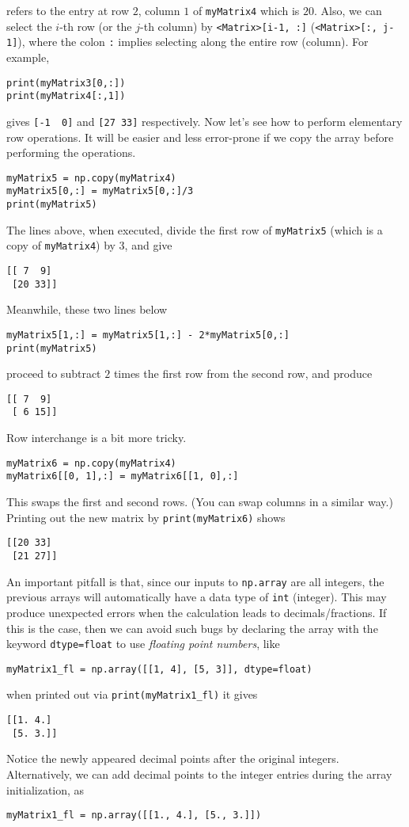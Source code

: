 refers to the entry at row $2$, column $1$ of \verb|myMatrix4| which is $20$. Also, we can select the $i$-th row (or the $j$-th column) by \verb|<Matrix>[i-1, :]| (\verb|<Matrix>[:, j-1]|), where the colon \verb|:| implies selecting along the entire row (column). For example,
\begin{lstlisting}
print(myMatrix3[0,:])
print(myMatrix4[:,1])
\end{lstlisting}
gives
\verb|[-1  0]| and \verb|[27 33]| respectively. Now let's see how to perform elementary row operations. It will be easier and less error-prone if we copy the array before performing the operations.
\begin{lstlisting}
myMatrix5 = np.copy(myMatrix4)
myMatrix5[0,:] = myMatrix5[0,:]/3
print(myMatrix5)
\end{lstlisting}
The lines above, when executed, divide the first row of \verb|myMatrix5| (which is a copy of \verb|myMatrix4|) by $3$, and give
\begin{lstlisting}
[[ 7  9]
 [20 33]]    
\end{lstlisting}
Meanwhile, these two lines below
\begin{lstlisting}
myMatrix5[1,:] = myMatrix5[1,:] - 2*myMatrix5[0,:]
print(myMatrix5)
\end{lstlisting}
proceed to subtract $2$ times the first row from the second row, and produce
\begin{lstlisting}
[[ 7  9]
 [ 6 15]]
\end{lstlisting}
Row interchange is a bit more tricky.
\begin{lstlisting}
myMatrix6 = np.copy(myMatrix4)
myMatrix6[[0, 1],:] = myMatrix6[[1, 0],:]
\end{lstlisting}
This swaps the first and second rows. (You can swap columns in a similar way.) Printing out the new matrix by \verb|print(myMatrix6)| shows
\begin{lstlisting}
[[20 33]
 [21 27]]
\end{lstlisting}
An important pitfall is that, since our inputs to \texttt{np.array} are all integers, the previous arrays will automatically have a data type of \texttt{int} (integer). This may produce unexpected errors when the calculation leads to decimals/fractions. If this is the case, then we can avoid such bugs by declaring the array with the keyword \verb|dtype=float| to use \textit{floating point numbers}, like
\begin{lstlisting}
myMatrix1_fl = np.array([[1, 4], [5, 3]], dtype=float)
\end{lstlisting}
when printed out via \verb|print(myMatrix1_fl)| it gives
\begin{lstlisting}
[[1. 4.]
 [5. 3.]]    
\end{lstlisting}
Notice the newly appeared decimal points after the original integers. Alternatively, we can add decimal points to the integer entries during the array initialization, as
\begin{lstlisting}
myMatrix1_fl = np.array([[1., 4.], [5., 3.]])
\end{lstlisting}


